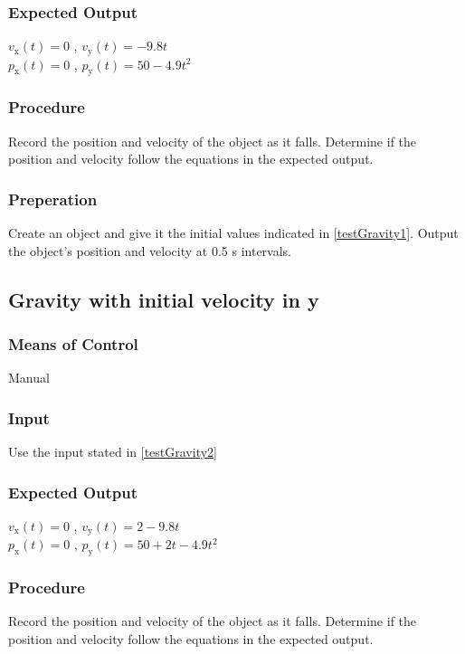 \documentclass[12pt]{article}
\begin{document}
\subsubsection{Expected Output}
$v_\text{x}(t) = 0$ , $v_\text{y}(t) = -9.8t$ \\
$p_\text{x}(t) = 0$ , $p_\text{y}(t) = 50 - 4.9t^{2}$
 
\subsubsection{Procedure}
Record the position and velocity of the object as it falls. Determine if the 
position and velocity follow the equations in the expected output.  

\subsubsection{Preperation}
Create an object and give it the initial values indicated in \ref{testGravity1}.
Output the object's position and velocity at 0.5 s intervals.


\subsection{Gravity with initial velocity in y}
\subsubsection{Means of Control}
Manual
\subsubsection{Input}
Use the input stated in \ref{testGravity2}

\subsubsection{Expected Output}
$v_\text{x}(t) = 0$ , $v_\text{y}(t) =  2 -9.8t$ \\
$p_\text{x}(t) = 0$ , $p_\text{y}(t) = 50 + 2t - 4.9t^{2}$
 
\subsubsection{Procedure}
Record the position and velocity of the object as it falls. Determine if the 
position and velocity follow the equations in the expected output.  
\end{document}
